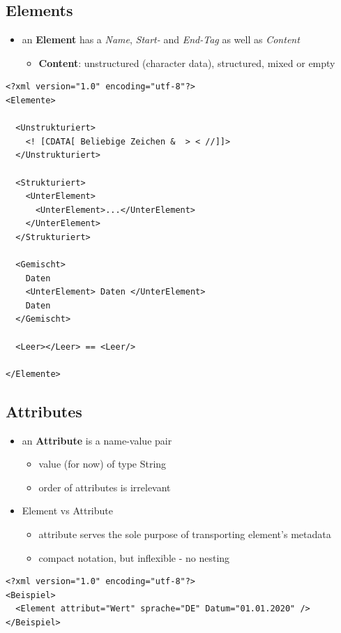 \documentclass[11pt]{article}
\begin{document}
\subsection{Elements}
\label{sec:org263125a}
\begin{itemize}
\item an \textbf{Element} has a \emph{Name}, \emph{Start-} and \emph{End-Tag} as well as \emph{Content}
\begin{itemize}
\item \textbf{Content}: unstructured (character data), structured, mixed or empty
\end{itemize}
\end{itemize}
\lstset{breaklines=true,language=XML,label= ,caption= ,captionpos=b,numbers=none}
\begin{lstlisting}
<?xml version="1.0" encoding="utf-8"?>
<Elemente>

  <Unstrukturiert>
    <! [CDATA[ Beliebige Zeichen &  > < //]]>
  </Unstrukturiert>

  <Strukturiert>
    <UnterElement>
      <UnterElement>...</UnterElement>
    </UnterElement>
  </Strukturiert>

  <Gemischt>
    Daten
    <UnterElement> Daten </UnterElement>
    Daten
  </Gemischt>

  <Leer></Leer> == <Leer/>

</Elemente>

\end{lstlisting}
\subsection{Attributes}
\label{sec:org5750325}
\begin{itemize}
\item an \textbf{Attribute} is a name-value pair
\begin{itemize}
\item value (for now) of type String
\item order of attributes is irrelevant
\end{itemize}
\item Element vs Attribute
\begin{itemize}
\item attribute serves the sole purpose of transporting element's metadata
\item compact notation, but inflexible - no nesting
\end{itemize}
\end{itemize}
\lstset{breaklines=true,language=XML,label= ,caption= ,captionpos=b,numbers=none}
\begin{lstlisting}
<?xml version="1.0" encoding="utf-8"?>
<Beispiel>
  <Element attribut="Wert" sprache="DE" Datum="01.01.2020" />
</Beispiel>
\end{lstlisting}
\end{document}
